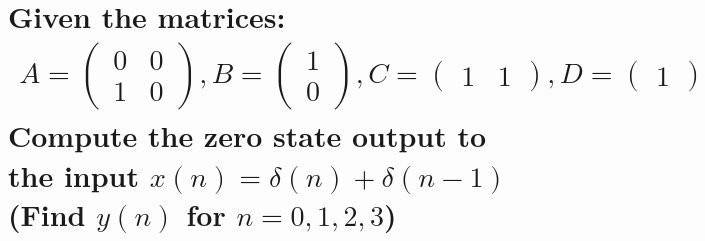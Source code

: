 \documentclass{article}
\begin{document}
\section[Question ~\thesection]{Given the matrices: \begin{align*} A = \begin{pmatrix} 0 & 0 \\ 1 & 0 \end{pmatrix}, B = \begin{pmatrix} 1 \\ 0 \end{pmatrix}, C = \begin{pmatrix} 1 & 1 \end{pmatrix}, D = \begin{pmatrix} 1 \end{pmatrix} \end{align*} Compute the zero state output to the input $x(n) = \delta(n) + \delta(n - 1)$ (Find $y(n)$ for $n=0, 1, 2, 3$)}
\end{document}
